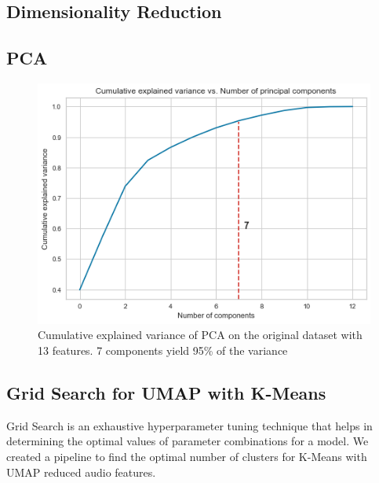 \begin{appendix}
\section{Dimensionality Reduction}
\label{appendix:B}
\subsection{PCA}
\begin{figure}[h!]
\centering
\centerline{\includegraphics[scale=0.3]{Outputs/PCA - Number of Components.png}}
\captionsetup{justification=centering,margin=1cm}
\caption{Cumulative explained variance of PCA on the original dataset with 13 features. 7 components yield 95\% of the variance}
\end{figure}

\subsection{Grid Search for UMAP with K-Means}
Grid Search is an exhaustive hyperparameter tuning technique that helps in determining the optimal values of parameter combinations for a model. We created a pipeline to find the optimal number of clusters for K-Means with UMAP reduced audio features.


\end{appendix}

